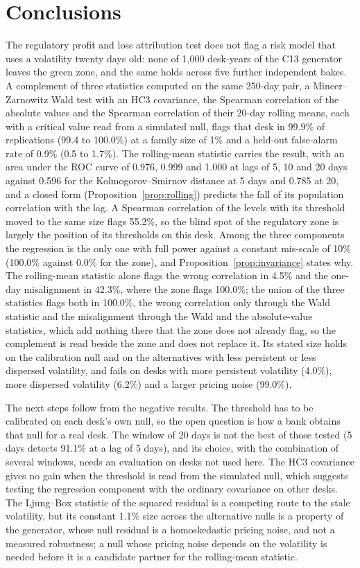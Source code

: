 \section{Conclusions}
\label{sec:conclusions}

The regulatory profit and loss attribution test does not flag a risk model that uses a volatility twenty days old: none of 1,000 desk-years of the C13 generator leaves the green zone, and the same holds across five further independent bakes.
A complement of three statistics computed on the same 250-day pair, a Mincer--Zarnowitz Wald test with an HC3 covariance, the Spearman correlation of the absolute values and the Spearman correlation of their 20-day rolling means, each with a critical value read from a simulated null, flags that desk in 99.9\% of replications (99.4 to 100.0\%) at a family size of 1\% and a held-out false-alarm rate of 0.9\% (0.5 to 1.7\%).
The rolling-mean statistic carries the result, with an area under the ROC curve of 0.976, 0.999 and 1.000 at lags of 5, 10 and 20 days against 0.596 for the Kolmogorov--Smirnov distance at 5 days and 0.785 at 20, and a closed form (Proposition~\ref{prop:rolling}) predicts the fall of its population correlation with the lag.
A Spearman correlation of the levels with its threshold moved to the same size flags 55.2\%, so the blind spot of the regulatory zone is largely the position of its thresholds on this desk.
Among the three components the regression is the only one with full power against a constant mis-scale of 10\% (100.0\% against 0.0\% for the zone), and Proposition~\ref{prop:invariance} states why.
The rolling-mean statistic alone flags the wrong correlation in 4.5\% and the one-day misalignment in 42.3\%, where the zone flags 100.0\%; the union of the three statistics flags both in 100.0\%, the wrong correlation only through the Wald statistic and the misalignment through the Wald and the absolute-value statistics, which add nothing there that the zone does not already flag, so the complement is read beside the zone and does not replace it.
Its stated size holds on the calibration null and on the alternatives with less persistent or less dispersed volatility, and fails on desks with more persistent volatility (4.0\%), more dispersed volatility (6.2\%) and a larger pricing noise (99.0\%).

The next steps follow from the negative results.
The threshold has to be calibrated on each desk's own null, so the open question is how a bank obtains that null for a real desk.
The window of 20 days is not the best of those tested (5 days detects 91.1\% at a lag of 5 days), and its choice, with the combination of several windows, needs an evaluation on desks not used here.
The HC3 covariance gives no gain when the threshold is read from the simulated null, which suggests testing the regression component with the ordinary covariance on other desks.
The Ljung--Box statistic of the squared residual is a competing route to the stale volatility, but its constant 1.1\% size across the alternative nulls is a property of the generator, whose null residual is a homoskedastic pricing noise, and not a measured robustness; a null whose pricing noise depends on the volatility is needed before it is a candidate partner for the rolling-mean statistic.
